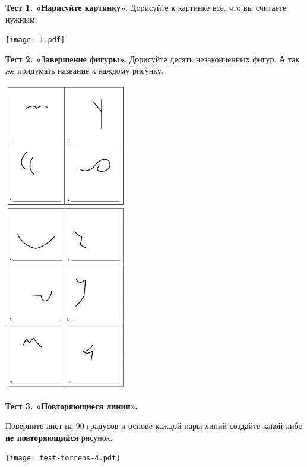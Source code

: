 
\usepackage{lscape}
\usepackage{enumitem, kantlipsum}
\setlength{\columnsep}{1cm}
\usepackage[left=1cm,right=1cm, top=0.5cm, bottom=0.5cm]{geometry}
\pagestyle{empty} %

\begin{landscape}
    \begin{multicols}{3}
        \textbf{Тест 1. «Нарисуйте картинку».}
        Дорисуйте к картинке всё, что вы считаете нужным. 
        
        \begin{center}
            \texttt{[image: 1.pdf]}
        \end{center}

        \textbf{Тест 2. «Завершение фигуры».} 
        Дорисуйте десять 
        незаконченных фигур. А так же 
        придумать название к каждому рисунку. 
        \columnbreak

        \includegraphics[width=0.4\textwidth]{test-torrens.jpg}
        
        \textbf{Тест 3. «Повторяющиеся линии».}
       
        Поверните лист на 90 градусов и основе каждой пары линий создайте
        какой-либо \textbf{не повторяющийся} рисунок.

        \texttt{[image: test-torrens-4.pdf]}
        

\end{multicols}
\end{landscape}
